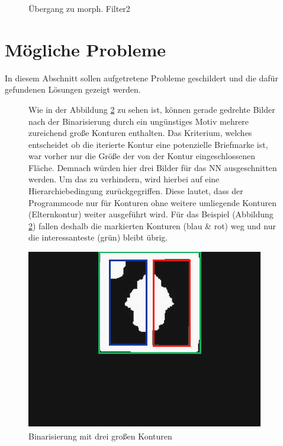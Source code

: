 \documentclass[12pt,toc=bib,toc=listof]{scrreprt}
\begin{document}
\begin{figure}[h]
\begin{minipage}[t]{.2\linewidth}
  \caption{Übergang zu morph. Filter2}
  \label{fig:bv_morph2}
\end{minipage}
\end{figure}


\section{Mögliche Probleme}
\label{sec_bv:probleme}
In diesem Abschnitt sollen aufgetretene Probleme geschildert und die dafür gefundenen Lösungen gezeigt werden.\\

\begin{figure}[h]
\begin{minipage}[t]{.75\linewidth}

Wie in der Abbildung \ref{fig:bv_prob1} zu sehen ist, können gerade gedrehte Bilder nach der Binarisierung durch ein ungünstiges Motiv mehrere zureichend große Konturen enthalten. Das Kriterium, welches entscheidet ob die iterierte Kontur eine potenzielle Briefmarke ist, war vorher nur die Größe der von der  Kontur eingeschlossenen Fläche. Demnach würden hier drei Bilder für das NN ausgeschnitten werden. Um das zu verhindern, wird hierbei auf eine Hierarchiebedingung zurückgegriffen. Diese lautet, dass der Programmcode nur für Konturen ohne weitere umliegende Konturen (Elternkontur) weiter ausgeführt wird. Für das Beispiel (Abbildung \ref{fig:bv_prob1}) fallen deshalb die markierten Konturen (blau \& rot) weg und nur die interessanteste (grün) bleibt übrig.
\end{minipage}
\hfill
\begin{minipage}[t]{.2\linewidth}
\strut\vspace*{-\baselineskip}
\newline
  \includegraphics[width=\linewidth]{./../bilder/prob1_bin}
  \caption{Binarisierung mit drei großen Konturen}
  \label{fig:bv_prob1}
\end{minipage}
\end{figure}
\end{document}
